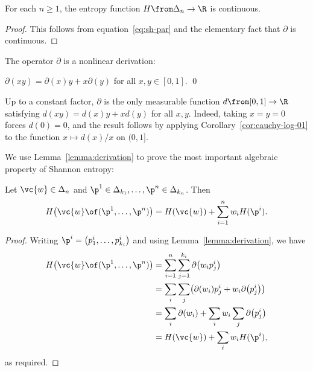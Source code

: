 \begin{lemma}
For each $n \geq 1$, the entropy function $H \from \Delta_n \to \R$ is
continuous. 
\end{lemma}

\begin{proof}
This follows from equation~\eqref{eq:sh-par} and the elementary fact
that $\partial$ is continuous.
\end{proof}

The operator $\partial$ is a nonlinear derivation:
% 
\begin{lemma}
$\partial(xy) = \partial(x)y + x\partial(y)$ for all $x, y \in [0, 1]$.
\qed
\end{lemma}

\begin{remark}
Up to a constant factor, $\partial$ is the only measurable function $d
\from [0, 1] \to \R$ satisfying $d(xy) = d(x)y + xd(y)$ for all $x, y$.
Indeed, taking $x = y = 0$ forces $d(0) = 0$, and the result follows
by applying Corollary~\ref{cor:cauchy-log-01} to the function $x \mapsto
d(x)/x$ on $(0, 1]$.
\end{remark}

We use Lemma~\ref{lemma:derivation} to prove the most important algebraic
property of Shannon entropy:

\begin{propn}
% 
Let $\vc{w} \in \Delta_n$ and $\p^1 \in \Delta_{k_1}, \ldots, \p^n \in
\Delta_{k_n}$.  Then
\[
H\bigl(\vc{w} \of (\p^1, \ldots, \p^n)\bigr)
=
H(\vc{w}) + \sum_{i = 1}^n w_i H(\p^i).
\]
\end{propn}

\begin{proof}
Writing $\p^i = \bigl(p^i_1, \ldots, p^i_{k_i}\bigr)$ and using
Lemma~\ref{lemma:derivation}, we have
% 
\begin{align*}
H\bigl(\vc{w} \of (\p^1, \ldots, \p^n)\bigr)    &
=
\sum_{i = 1}^n \sum_{j = 1}^{k_i} \partial \bigl(w_i p^i_j\bigr)   \\
&
=
\sum_{i} \sum_{j}
\bigl(\partial(w_i) p^i_j + w_i \partial\bigl(p^i_j\bigr)\bigr)   \\
&
=
\sum_{i} \partial(w_i) 
+
\sum_{i} w_i 
\sum_{j} \partial\bigl(p^i_j\bigr) \\
&
=
H(\vc{w}) + \sum_i w_i H(\p^i),
\end{align*}
% 
as required.
\end{proof}

